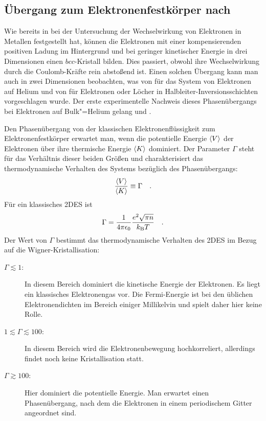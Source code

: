\subsection{Übergang zum Elektronenfestkörper nach }

Wie  bereits in \cite{Wig34} bei der Untersuchung der Wechselwirkung von Elektronen in Metallen festgestellt hat, können die Elektronen mit einer kompensierenden positiven Ladung im Hintergrund und bei geringer kinetischer Energie in drei Dimensionen einen $bcc$-Kristall bilden. Dies passiert, obwohl ihre Wechselwirkung durch die Coulomb-Kräfte rein abstoßend ist. Einen solchen Übergang kann man auch in zwei Dimensionen beobachten, was von  \ea{} \cite{Cra71} für das System von Elektronen auf Helium und von  \ea{} \cite{Cha72} für Elektronen oder Löcher in Halbleiter-Inversionsschichten vorgeschlagen wurde. Der erste experimentelle Nachweis dieses Phasenübergangs bei Elektronen auf Bulk"=Helium gelang  und  \cite{Gri79}.

Den Phasenübergang von der klassischen Elektronenflüssigkeit zum Elektronenfestkörper erwartet man, wenn die potentielle Energie $\left<V\right>$ der Elektronen über ihre thermische Energie $\left<K\right>$ dominiert. Der Parameter $\Gamma$ steht für das Verhältnis dieser beiden Größen und charakterisiert das thermodynamische Verhalten des Systems bezüglich des Phasenübergangs:
    \begin{equation}
        \label{eqn:tph_VWRatio}
        \frac{\left<V\right>}{\left<K\right>} \equiv \Gamma\quad.
    \end{equation}
Für ein klassisches 2DES ist
	\begin{equation}
		\label{eqn:Gamma_klass}
		\Gamma=\frac1{4\pi\epsilon_0}\frac{e^2\sqrt{\pi n}}{k_\text{B} T}\quad.
	\end{equation}
Der Wert von $\Gamma$ bestimmt das thermodynamische Verhalten des 2DES im Bezug auf die Wigner-Kristallisation:
\begin{description}
	\item[$\Gamma\lesssim1$:] In diesem Bereich dominiert die kinetische Energie der Elektronen. Es liegt ein klassisches Elektronengas vor. Die Fermi-Energie ist bei den üblichen Elektronendichten im Bereich einiger Millikelvin und spielt daher hier keine Rolle.
	\item[$1\lesssim\Gamma\lesssim100$:] In diesem Bereich wird die Elektronenbewegung hochkorreliert, allerdings findet noch keine Kristallisation statt.
	\item[$\Gamma\gtrsim100$:] Hier dominiert die potentielle Energie. Man erwartet einen Phasenübergang, nach dem die Elektronen in einem periodischem Gitter angeordnet sind.
\end{description}

